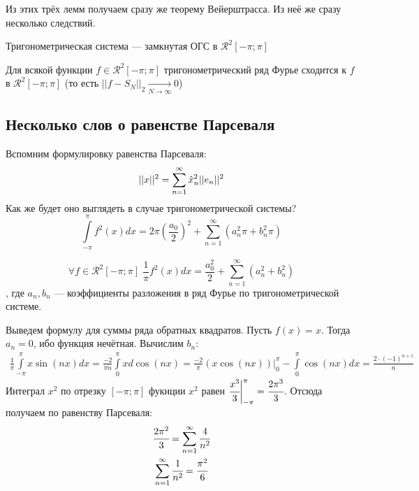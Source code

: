 Из этих трёх лемм получаем сразу же теорему Вейерштрасса. Из неё же сразу несколько следствий.
\begin{Consequence}
	Тригонометрическая система --- замкнутая ОГС в $\mathcal{R}^2[-\pi;\pi]$
\end{Consequence}
\begin{Consequence}
	Для всякой функции $f \in \mathcal{R}^2[-\pi;\pi]$ тригонометрический ряд Фурье сходится к $f$ в $\mathcal{R}^2[-\pi; \pi]$ (то есть $|| f - S_N||_2\underset{N \to \infty}{\longrightarrow} 0$)
\end{Consequence}
\subsection{Несколько слов о равенстве Парсеваля}
Вспомним формулировку равенства Парсеваля:
$$
	||x||^2 = \sum\limits_{n=1}^{\infty} \hat{x}_n^2 ||e_n||^2
$$
Как же будет оно выглядеть в случае тригонометрической системы? 
$$\int\limits_{-\pi}^{\pi} f^2(x)dx =2\pi\left( \frac{a_0}{2}\right)^2 + \sum\limits_{n=1}^{\infty}(a_n^2\pi + b_n^2\pi)
$$
\begin{Consequence}
	$$
	\forall f \in \mathcal{R}^2[-\pi;\pi]\; \frac{1}{\pi}f^2(x)dx = \frac{a_0^2}{2} + \sum\limits_{n=1}^{\infty}(a_n^2 + b_n^2)
	$$, где $a_n, b_n$ --- коэффициенты разложения в ряд Фурье по тригонометрической системе.
\end{Consequence}
\begin{Examples}
	Выведем формулу для суммы ряда обратных квадратов. Пусть $f(x) = x$. Тогда $a_n = 0$, ибо функция нечётная. Вычислим $b_n$:
	\begin{gather*}
		\frac{1}{\pi} \int \limits_{-\pi}^{\pi} x \sin(nx)dx = \frac{-2}{\pi n} \int \limits_{0}^{\pi}x d\cos(nx) = \frac{-2}{\pi}\left(x \cos(nx)\right)\biggr|_0^{\pi} - \int \limits_{0}^{\pi}\cos(nx) dx = \frac{2\cdot(-1)^{n+1}}{n}
	\end{gather*}
	Интеграл $x^2$ по отрезку $[-\pi;\pi]$ фукнции $x^2$ равен $\cfrac{x^3}{3}\biggr|_{-\pi}^{\pi} = \cfrac{2\pi^3}{3}$. Отсюда получаем по равенству Парсеваля:
	\begin{gather*}
		\cfrac{2\pi^2}{3} = \sum\limits_{n=1}^{\infty} \cfrac{4}{n^2}\\
		\sum\limits_{n=1}^{\infty} \cfrac{1}{n^2} = \cfrac{\pi^2}{6}
	\end{gather*}
\end{Examples}

